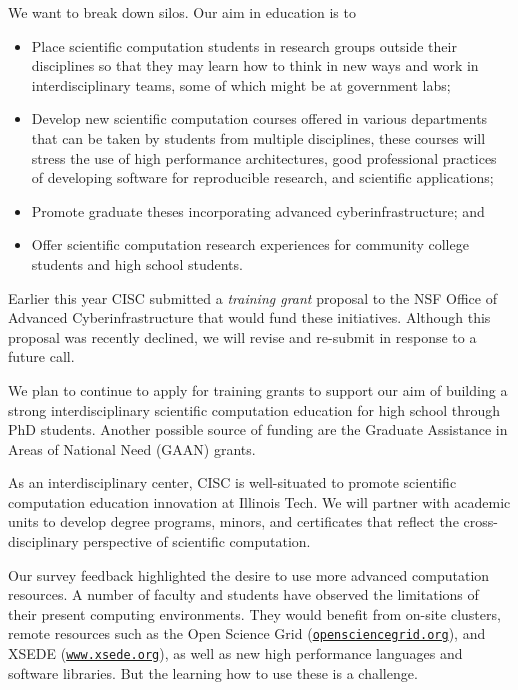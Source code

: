 \documentclass[12pt]{amsart}
\begin{document}
We want to break down silos.  Our aim in education is to
\begin{itemize}
    \item Place scientific computation students in research groups outside their disciplines so that they may learn how to think in new ways and work in interdisciplinary teams, some of which might be at government labs;
    
    \item Develop new scientific computation courses offered in various departments that can be taken by students from multiple disciplines, these courses will stress the use of high performance architectures, good professional practices of developing software for reproducible research, and scientific applications;
    
    \item Promote graduate theses incorporating advanced cyberinfrastructure; and
    
    \item Offer scientific computation research experiences for community college students and high school students.

\end{itemize}
Earlier this year CISC submitted a \emph{training grant} proposal to the NSF Office of Advanced Cyberinfrastructure that would fund these initiatives.  Although this proposal was recently declined, we will revise and re-submit in response to a future call.

We plan to continue to apply for training grants to support our aim of building a strong interdisciplinary scientific computation education for high school through PhD students.  Another possible source of funding are the Graduate Assistance in Areas of National Need (GAAN) grants. 

As an interdisciplinary center, CISC is well-situated to promote scientific computation education innovation at Illinois Tech.  We will partner with academic units to develop degree programs, minors, and certificates that reflect the cross-disciplinary perspective of scientific computation.

Our survey feedback highlighted the desire to use more advanced computation resources.  A number of faculty and students have observed the limitations of their present computing environments.  They would benefit from on-site clusters, remote resources such as the Open Science Grid (\href{http://opensciencegrid.org}{\nolinkurl{opensciencegrid.org}}), and XSEDE (\href{https://www.xsede.org}{\nolinkurl{www.xsede.org}}), as well as new high performance languages and software libraries.  But the learning how to use these is a challenge.
\end{document}
